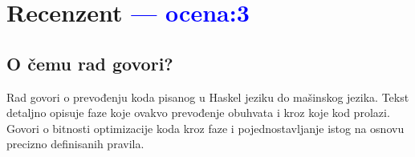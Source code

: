 \documentclass[a4paper]{report}
\newcommand{\odgovor}[1]{\textcolor{blue}{#1}}
\begin{document}
	\chapter{Recenzent \odgovor{--- ocena:3} }
	
	
	\section{O čemu rad govori?}
	Rad govori o prevođenju koda pisanog u Haskel jeziku do mašinskog jezika. Tekst detaljno opisuje faze koje ovakvo prevođenje obuhvata i kroz koje kod prolazi. Govori o bitnosti optimizacije koda kroz faze i pojednostavljanje istog na osnovu precizno definisanih pravila. 
	
\end{document}
